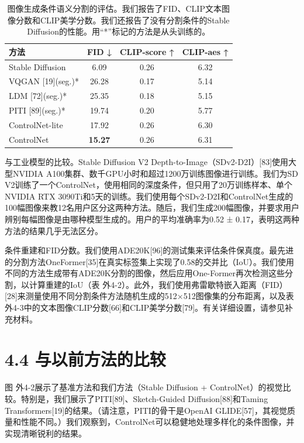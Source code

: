 \documentclass[a4paper,AutoFakeBold,oneside,12pt]{book}
\begin{document}
\begin{nopagenumber}
\begin{table}[ht]
    \centering
    \begin{tabular}{|l|c|c|c|}
        \hline
        \textbf{方法} & \textbf{FID ↓} & \textbf{CLIP-score ↑} & \textbf{CLIP-aes ↑} \\
        \hline
        Stable Diffusion & 6.09 & 0.26 & 6.32 \\
        VQGAN [19](seg.)* & 26.28 & 0.17 & 5.14 \\
        LDM [72](seg.)* & 25.35 & 0.18 & 5.15 \\
        PITI [89](seg.)* & 19.74 & 0.20 & 5.77 \\
        ControlNet-lite & 17.92 & 0.26 & 6.30 \\
        ControlNet & \textbf{15.27} & 0.26 & 6.31 \\
        \hline
    \end{tabular}
    \caption{图像生成条件语义分割的评估。我们报告了FID、CLIP文本图像分数和CLIP美学分数。我们还报告了没有分割条件的Stable Diffusion的性能。用“*”标记的方法是从头训练的。}
    \label{tab:fid-clip-eval}
\end{table}

与工业模型的比较。Stable Diffusion V2 Depth-to-Image（SDv2-D2I）[83]使用大型NVIDIA A100集群、数千GPU小时和超过1200万训练图像进行训练。我们为SD V2训练了一个ControlNet，使用相同的深度条件，但只用了20万训练样本、单个NVIDIA RTX 3090Ti和5天的训练。我们使用每个SDv2-D2I和ControlNet生成的100幅图像来教12名用户区分这两种方法。随后，我们生成200幅图像，并要求用户辨别每幅图像是由哪种模型生成的。用户的平均准确率为0.52 ± 0.17，表明这两种方法的结果几乎无法区分。

条件重建和FID分数。我们使用ADE20K[96]的测试集来评估条件保真度。最先进的分割方法OneFormer[35]在真实标签集上实现了0.58的交并比（IoU）。我们使用不同的方法生成带有ADE20K分割的图像，然后应用One-Former再次检测这些分割，以计算重建的IoU（表 外4-2）。此外，我们使用弗雷歇特嵌入距离（FID）[28]来测量使用不同分割条件方法随机生成的512×512图像集的分布距离，以及表 外4-3中的文本图像CLIP分数[66]和CLIP美学分数[79]。有关详细设置，请参见补充材料。

\section*{4.4\quad{} 与以前方法的比较}
图 外4-2展示了基准方法和我们方法（Stable Diffusion + ControlNet）的视觉比较。特别是，我们展示了PITI[89]、Sketch-Guided Diffusion[88]和Taming Transformers[19]的结果。（请注意，PITI的骨干是OpenAI GLIDE[57]，其视觉质量和性能不同。）我们观察到，ControlNet可以稳健地处理多样化的条件图像，并实现清晰锐利的结果。


\end{nopagenumber}
\end{document}

